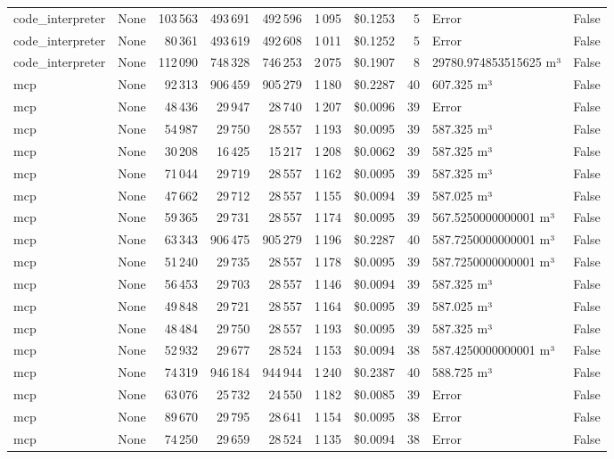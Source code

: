 \documentclass[a4paper,11pt]{article}
\begin{document}
\begin{table}[H]
{\begin{tabular}{l r r r r r r r l r}
code\_interpreter & None & 103\,563 & 493\,691 & 492\,596 & 1\,095 & \$0.1253 & 5 & Error & False \\
code\_interpreter & None & 80\,361 & 493\,619 & 492\,608 & 1\,011 & \$0.1252 & 5 & Error & False \\
code\_interpreter & None & 112\,090 & 748\,328 & 746\,253 & 2\,075 & \$0.1907 & 8 & 29780.974853515625 m³ & False \\
\midrule
mcp & None & 92\,313 & 906\,459 & 905\,279 & 1\,180 & \$0.2287 & 40 & 607.325 m³ & False \\
mcp & None & 48\,436 & 29\,947 & 28\,740 & 1\,207 & \$0.0096 & 39 & Error & False \\
mcp & None & 54\,987 & 29\,750 & 28\,557 & 1\,193 & \$0.0095 & 39 & 587.325 m³ & False \\
mcp & None & 30\,208 & 16\,425 & 15\,217 & 1\,208 & \$0.0062 & 39 & 587.325 m³ & False \\
mcp & None & 71\,044 & 29\,719 & 28\,557 & 1\,162 & \$0.0095 & 39 & 587.325 m³ & False \\
mcp & None & 47\,662 & 29\,712 & 28\,557 & 1\,155 & \$0.0094 & 39 & 587.025 m³ & False \\
mcp & None & 59\,365 & 29\,731 & 28\,557 & 1\,174 & \$0.0095 & 39 & 567.5250000000001 m³ & False \\
mcp & None & 63\,343 & 906\,475 & 905\,279 & 1\,196 & \$0.2287 & 40 & 587.7250000000001 m³ & False \\
mcp & None & 51\,240 & 29\,735 & 28\,557 & 1\,178 & \$0.0095 & 39 & 587.7250000000001 m³ & False \\
mcp & None & 56\,453 & 29\,703 & 28\,557 & 1\,146 & \$0.0094 & 39 & 587.325 m³ & False \\
mcp & None & 49\,848 & 29\,721 & 28\,557 & 1\,164 & \$0.0095 & 39 & 587.025 m³ & False \\
mcp & None & 48\,484 & 29\,750 & 28\,557 & 1\,193 & \$0.0095 & 39 & 587.325 m³ & False \\
mcp & None & 52\,932 & 29\,677 & 28\,524 & 1\,153 & \$0.0094 & 38 & 587.4250000000001 m³ & False \\
mcp & None & 74\,319 & 946\,184 & 944\,944 & 1\,240 & \$0.2387 & 40 & 588.725 m³ & False \\
mcp & None & 63\,076 & 25\,732 & 24\,550 & 1\,182 & \$0.0085 & 39 & Error & False \\
mcp & None & 89\,670 & 29\,795 & 28\,641 & 1\,154 & \$0.0095 & 38 & Error & False \\
mcp & None & 74\,250 & 29\,659 & 28\,524 & 1\,135 & \$0.0094 & 38 & Error & False \\

\end{tabular}}
\end{table}
\end{document}
